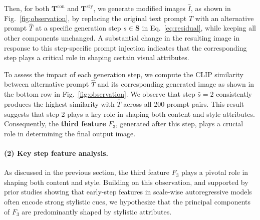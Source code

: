\documentclass[10pt,twocolumn,letterpaper]{article}
\newcommand{\figref}[1]{Fig.~\ref{#1}}
\begin{document}
Then, for both $\textbf{T}^\text{con}$ and $\textbf{T}^\text{sty}$, we generate modified images $\hat{I}$, as shown in \figref{fig:observation}, by replacing the original text prompt $T$ with an alternative prompt $\hat{T}$ at a specific generation step $s \in \mathbf{S}$ in Eq.~\ref{eq:residual}, while keeping all other components unchanged.
A substantial change in the resulting image in response to this step-specific prompt injection indicates that the corresponding step plays a critical role in shaping certain visual attributes.

To assess the impact of each generation step, we compute the CLIP similarity \cite{radford2021learning} between alternative prompt \({\hat{T}}\) and its corresponding generated image as shown in the bottom row in \figref{fig:observation}. 
We observe that step $\hat{s} = 2$ consistently produces the highest similarity with $\hat{T}$ across all 200 prompt pairs.
This result suggests that step 2 plays a key role in shaping both content and style attributes. Consequently, the \textbf{third feature} $F_3$, generated after this step, plays a crucial role in determining the final output image.


\paragraph{(2) Key step feature analysis.}
As discussed in the previous section, the third feature $F_3$ plays a pivotal role in shaping both content and style. Building on this observation, and supported by prior studies \cite{park2025training,nguyen2025csd} showing that early-step features in scale-wise autoregressive models often encode strong stylistic cues, we hypothesize that the principal components of $F_3$ are predominantly shaped by stylistic attributes.
\end{document}
